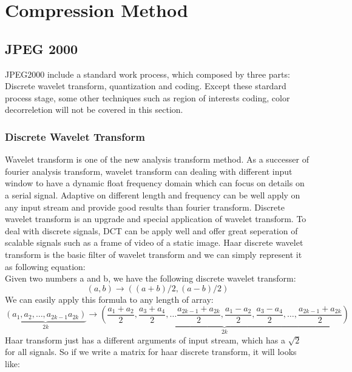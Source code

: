 \documentclass[UTF8, letterpaper, 14pt]{article}
\begin{document}
\section{Compression Method}
\subsection{JPEG 2000}
JPEG2000 include a standard work process, which composed by three parts: Discrete wavelet transform, quantization and coding. Except these stardard process stage, some other techniques such as region of interests coding, color decorreletion will not be covered in this section.
\subsubsection{Discrete Wavelet Transform}
Wavelet transform is one of the new analysis transform method. As a successer of fourier analysis transform, wavelet transform can dealing with different input window to have a dynamic float frequency domain which can focus on details on a serial signal. Adaptive on different length and frequency can be well apply on any input stream and provide good results than fourier transform.
Discrete wavelet transform is an upgrade and special application of wavelet transform. To deal with discrete signals, DCT can be apply well and offer great seperation of scalable signals such as a frame of video of a static image. Haar discrete wavelet transform is the basic filter of wavelet transform and we can simply represent it as following equation:\\
Given two numbers a and b, we have the following discrete wavelet transform:\\
\[(a,b) \rightarrow ( (a+b)/2 , (a-b)/2 )\]
We can easily apply this formula to any length of array:
\[\underbrace{(a_1, a_2, \ldots, a_{2k-1} a_{2k})}_{2k} \rightarrow \underbrace{( \frac{a_1+a_2}{2}, \frac{a_3+a_4}{2}, \ldots \frac{a_{2k-1}+a_{2k}}{2}, \frac{a_1-a_2}{2}, \frac{a_3-a_4}{2},\ldots, \frac{a_{2k-1}+a_{2k}}{2})}_{2k}\]
Haar transform just has a different arguments of input stream, which has a $\sqrt{2}$ for all signals.\cite{hwtmath} So if we write a matrix for haar discrete transform, it will looks like:\\
\end{document}
